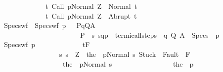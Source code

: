 \begin{isabellebody}
\ \ \ \ \ \ \ \ \ \ \ \ \ {\isacharbraceleft}t{\isachardot}\ {\isasymGamma}{\isasymturnstile}{\isasymlangle}Call\ p{\isacharcomma}Normal\ Z{\isasymrangle}\ {\isasymRightarrow}\ Normal\ t{\isacharbraceright}{\isacharcomma}\isanewline
\ \ \ \ \ \ \ \ \ \ \ \ \ {\isacharbraceleft}t{\isachardot}\ {\isasymGamma}{\isasymturnstile}{\isasymlangle}Call\ p{\isacharcomma}Normal\ Z{\isasymrangle}\ {\isasymRightarrow}\ Abrupt\ t{\isacharbraceright}{\isacharparenright}{\isacharbraceright}{\isacharparenright}{\isachardoublequoteclose}\isanewline
\ \ \ \ \isamarkupfalse%
\ Specs{\isacharunderscore}wf\ \ {\isachardoublequoteopen}Specs{\isacharunderscore}wf\ p\ {\isasymsigma}\ {\isacharequal}\ {\isacharparenleft}{\isasymlambda}{\isacharparenleft}P{\isacharcomma}q{\isacharcomma}Q{\isacharcomma}A{\isacharparenright}{\isachardot}\ \isanewline
\ \ \ \ \ \ \ \ \ \ \ \ \ \ \ \ \ \ \ \ \ \ \ {\isacharparenleft}P\ {\isasyminter}\ {\isacharbraceleft}s{\isachardot}\ {\isacharparenleft}{\isacharparenleft}s{\isacharcomma}q{\isacharparenright}{\isacharcomma}{\isasymsigma}{\isacharcomma}p{\isacharparenright}\ {\isasymin}\ termi{\isacharunderscore}call{\isacharunderscore}steps\ {\isasymGamma}{\isacharbraceright}{\isacharcomma}\ q{\isacharcomma}\ Q{\isacharcomma}\ A{\isacharparenright}{\isacharparenright}\ {\isacharbackquote}\ Specs{\isachardoublequoteclose}\ \ p\ {\isasymsigma}\isanewline
\ \ \ \ \isamarkupfalse%
\ {\isachardoublequoteopen}{\isasymGamma}{\isacharcomma}Specs{\isacharunderscore}wf\ p\ {\isasymsigma}\isanewline
\ \ \ \ \ \ \ \ \ \ \ \ {\isasymturnstile}\isactrlsub t\isactrlbsub {\isacharslash}F\isactrlesub {\isacharparenleft}{\isacharbraceleft}{\isasymsigma}{\isacharbraceright}\ {\isasyminter}\isanewline
\ \ \ \ \ \ \ \ \ \ \ \ \ \ \ \ \ {\isacharbraceleft}s{\isachardot}\ s\ {\isacharequal}\ Z\ {\isasymand}\ {\isasymGamma}{\isasymturnstile}{\isasymlangle}the\ {\isacharparenleft}{\isasymGamma}\ p{\isacharparenright}{\isacharcomma}Normal\ s{\isasymrangle}\ {\isasymRightarrow}{\isasymnotin}{\isacharparenleft}{\isacharbraceleft}Stuck{\isacharbraceright}\ {\isasymunion}\ Fault\ {\isacharbackquote}\ {\isacharparenleft}{\isacharminus}F{\isacharparenright}{\isacharparenright}\ {\isasymand}\ \isanewline
\ \ \ \ \ \ \ \ \ \ \ \ \ \ \ \ \ \ {\isasymGamma}{\isasymturnstile}the\ {\isacharparenleft}{\isasymGamma}\ p{\isacharparenright}{\isasymdown}Normal\ s{\isacharbraceright}{\isacharparenright}\ \isanewline
\ \ \ \ \ \ \ \ \ \ \ \ \ \ \ \ {\isacharparenleft}the\ {\isacharparenleft}{\isasymGamma}\ p{\isacharparenright}{\isacharparenright}\isanewline

\end{isabellebody}
